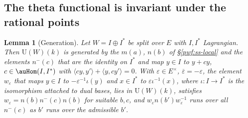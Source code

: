 \documentclass[10pt]{amsart}
\newtheorem{lemma}[theorem]{Lemma}
\theoremstyle{definition}
\theoremstyle{remark}
\providecommand{\auU}{\mathrm U}
\providecommand{\aubar}[1]{\overline{#1}}
\begin{document}
\subsection{The theta functional is invariant under the rational points}\label{pwf:ss-M4}

\begin{lemma}[Generation]\label{pwf:gen}
Let $W=I\oplus I^*$ be split over $E$ with $I,I^*$ Lagrangian. Then $\auU(W)(k)$ is generated by the
$m(a)$, $n(b)$ of \S\ref{pwf:ss-local} and the elements $n^-(c)$ that are the identity on $I^*$ and
map $y\in I$ to $y+cy$, $c\in\auHom(I,I^*)$ with $\langle cy,y'\rangle+\langle y,cy'\rangle=0$. With
$\varepsilon\in E^\times$, $\aubar\varepsilon=-\varepsilon$, the element $w_\varepsilon$ that maps
$y\in I$ to $-\varepsilon^{-1}\iota(y)$ and $x\in I^*$ to $\varepsilon\iota^{-1}(x)$, where
$\iota\colon I\to I^*$ is the isomorphism attached to dual bases, lies in $\auU(W)(k)$, satisfies
$w_\varepsilon=n(b)n^-(c)n(b)$ for suitable $b,c$, and $w_\varepsilon n(b')w_\varepsilon^{-1}$ runs
over all $n^-(c)$ as $b'$ runs over the admissible $b'$.
\end{lemma}
\end{document}

